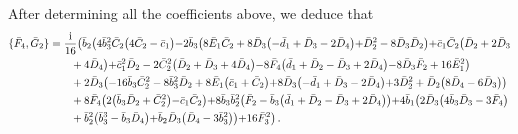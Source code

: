 \documentclass[10pt]{amsart}
\theoremstyle{definition}
\theoremstyle{corollary}
\theoremstyle{remark}
\theoremstyle{conclusion}
\begin{document}
After determining all the coefficients above, we deduce that 
\begin{align}
    	\{\bar{F}_4, \bar{G}_2\}&=\frac{{\rm i}}{16}  \bigl(\bar{b}_2 \bigl(4 \bar{b}_3^2 \bar{C}_2 \bigl(4 \bar{C}_2-\bar{c}_1\bigl)-2 \bar{b}_3 \bigl(8 \bar{E}_1 \bar{C}_2+8 \bar{D}_3 \bigl(-\bar{d}_1+\bar{D}_3-2 \bar{D}_4\bigl)+\bar{D}_2^2-8 \bar{D}_3 \bar{D}_2\bigl)+\bar{c}_1 \bar{C}_2 \bigl(\bar{D}_2+2 \bar{D}_3  \nonumber\\
	& \hskip 0.7cm +4 \bar{D}_4\bigl)+\bar{c}_1^2 \bar{D}_2-2 \bar{C}_2^2 \bigl(\bar{D}_2+\bar{D}_3+4 \bar{D}_4\bigl)-8 \bar{F}_4 \bigl(\bar{d}_1+\bar{D}_2-\bar{D}_3+2 \bar{D}_4\bigl)-8 \bar{D}_3 \bar{F}_2+16 \bar{E}_1^2\bigl) \nonumber\\
	& \hskip 0.7cm+2 \bar{D}_3 \bigl(-16 \bar{b}_3 \bar{C}_2^2-8 \bar{b}_3^2 \bar{D}_2+8 \bar{E}_1 \bigl(\bar{c}_1+\bar{C}_2\bigl)+8 \bar{D}_3 \bigl(-\bar{d}_1+\bar{D}_3-2 \bar{D}_4\bigl)+3 \bar{D}_2^2+\bar{D}_2 \bigl(8 \bar{D}_4-6 \bar{D}_3\bigl)\bigl) \nonumber\\
	& \hskip 0.7cm+8 \bar{F}_4 \bigl(2 \bigl(\bar{b}_3 \bar{D}_2+\bar{C}_2^2\bigl)-\bar{c}_1 \bar{C}_2\bigl)+8 \bar{b}_3 \bar{b}_2^2 \bigl(\bar{F}_2-\bar{b}_3 \bigl(\bar{d}_1+\bar{D}_2-\bar{D}_3+2 \bar{D}_4\bigl)\bigl)+4 \bar{b}_1 \bigl(2 \bar{D}_3 \bigl(4 \bar{b}_3 \bar{D}_3-3 \bar{F}_4\bigl) \nonumber\\
	& \hskip 0.7cm+\bar{b}_2^2 \bigl(\bar{b}_3^3-\bar{b}_3 \bar{D}_4\bigl)+\bar{b}_2 \bar{D}_3 \bigl(\bar{D}_4-3 \bar{b}_3^2\bigl)\bigl)+16 \bar{F}_3^2\bigl) \, . 
\end{align}
\end{document}
